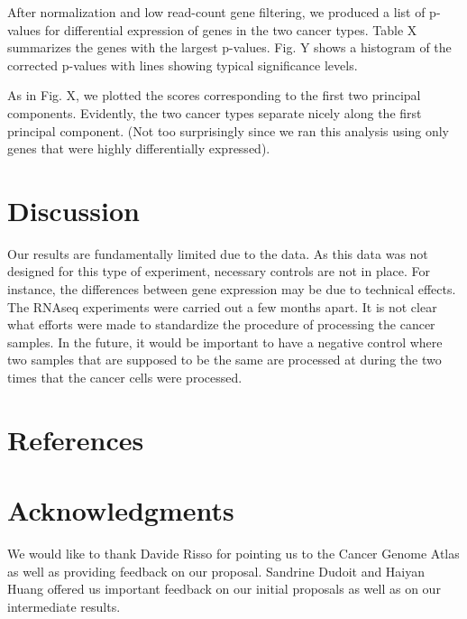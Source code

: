 After normalization and low read-count gene filtering, we produced a list of p-values for differential expression of genes in the two cancer types. Table X summarizes the genes with the largest p-values. Fig. Y shows a histogram of the corrected p-values with lines showing typical significance levels. 

As in Fig. X, we plotted the scores corresponding to the first two principal components. Evidently, the two cancer types separate nicely along the first principal component. (Not too surprisingly since we ran this analysis using only genes that were highly differentially expressed).  


\section{Discussion}

Our results are fundamentally limited due to the data. As this data was not designed for this type of experiment, necessary controls are not in place. For instance, the differences between gene expression may be due to technical effects. The RNAseq experiments were carried out a few months apart. It is not clear what efforts were made to standardize the procedure of processing the cancer samples. In the future, it would be important to have a negative control where two samples that are supposed to be the same are processed at during the two times that the cancer cells were processed. 

\section{References}


\section*{Acknowledgments}
We would like to thank Davide Risso for pointing us to the Cancer Genome Atlas as well as providing feedback on our proposal. Sandrine Dudoit and Haiyan Huang offered us important feedback on our initial proposals as well as on our intermediate results. 



